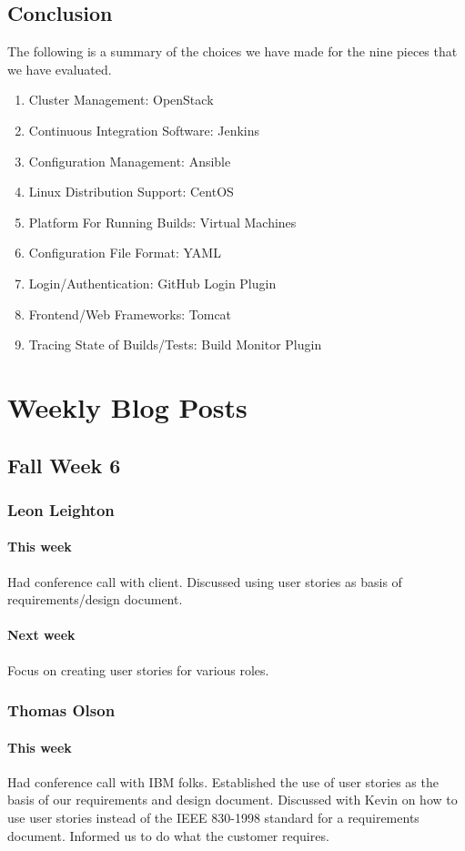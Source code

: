 \documentclass[10pt,letterpaper,onecolumn,draftclsnofoot]{IEEEtran}
\begin{document}
\subsection{Conclusion}
The following is a summary of the choices we have made for the nine pieces that we have evaluated.\\
\begin{enumerate}
  \item Cluster Management: OpenStack
  \item Continuous Integration Software: Jenkins
  \item Configuration Management: Ansible
  \item Linux Distribution Support: CentOS
  \item Platform For Running Builds: Virtual Machines
  \item Configuration File Format: YAML
  \item Login/Authentication: GitHub Login Plugin
  \item Frontend/Web Frameworks: Tomcat
  \item Tracing State of Builds/Tests: Build Monitor Plugin
\end{enumerate}

\section{Weekly Blog Posts}
\subsection{Fall Week 6}
\subsubsection{Leon Leighton}
\paragraph{This week} Had conference call with client. Discussed using user stories as basis of requirements/design document.
\paragraph{Next week} Focus on creating user stories for various roles.
\subsubsection{Thomas Olson}
\paragraph{This week}Had conference call with IBM folks. Established the use of user stories as the basis of our requirements and design document. Discussed with Kevin on how to use user stories instead of the IEEE 830-1998 standard for a requirements document. Informed us to do what the customer requires.
\end{document}
